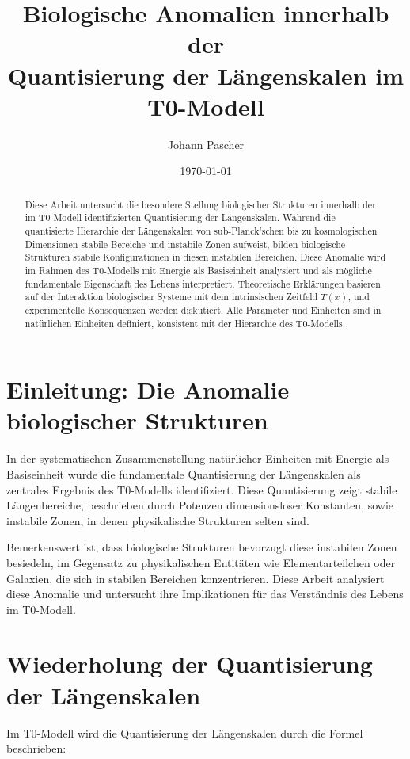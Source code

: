 \documentclass[12pt,a4paper]{article}
\title{Biologische Anomalien innerhalb der\\Quantisierung der Längenskalen im T0-Modell}
\author{Johann Pascher}
\date{\today}
\newcommand{\Tfield}{T(x)}
\begin{document}
	
	\maketitle
	
	\begin{abstract}
		Diese Arbeit untersucht die besondere Stellung biologischer Strukturen innerhalb der im T0-Modell identifizierten Quantisierung der Längenskalen. Während die quantisierte Hierarchie der Längenskalen von sub-Planck'schen bis zu kosmologischen Dimensionen stabile Bereiche und instabile Zonen aufweist, bilden biologische Strukturen stabile Konfigurationen in diesen instabilen Bereichen. Diese Anomalie wird im Rahmen des T0-Modells mit Energie als Basiseinheit analysiert und als mögliche fundamentale Eigenschaft des Lebens interpretiert. Theoretische Erklärungen basieren auf der Interaktion biologischer Systeme mit dem intrinsischen Zeitfeld $\Tfield$, und experimentelle Konsequenzen werden diskutiert. Alle Parameter und Einheiten sind in natürlichen Einheiten definiert, konsistent mit der Hierarchie des T0-Modells \cite{pascher_nateinheiten_2025}.
	\end{abstract}
	
	\section{Einleitung: Die Anomalie biologischer Strukturen}
	
	In der systematischen Zusammenstellung natürlicher Einheiten mit Energie als Basiseinheit \cite{pascher_nateinheiten_2025} wurde die fundamentale Quantisierung der Längenskalen als zentrales Ergebnis des T0-Modells identifiziert. Diese Quantisierung zeigt stabile Längenbereiche, beschrieben durch Potenzen dimensionsloser Konstanten, sowie instabile Zonen, in denen physikalische Strukturen selten sind.
	
	Bemerkenswert ist, dass biologische Strukturen bevorzugt diese instabilen Zonen besiedeln, im Gegensatz zu physikalischen Entitäten wie Elementarteilchen oder Galaxien, die sich in stabilen Bereichen konzentrieren. Diese Arbeit analysiert diese Anomalie und untersucht ihre Implikationen für das Verständnis des Lebens im T0-Modell.
	
	\section{Wiederholung der Quantisierung der Längenskalen}
	
	Im T0-Modell wird die Quantisierung der Längenskalen durch die Formel beschrieben:
	
\end{document}
